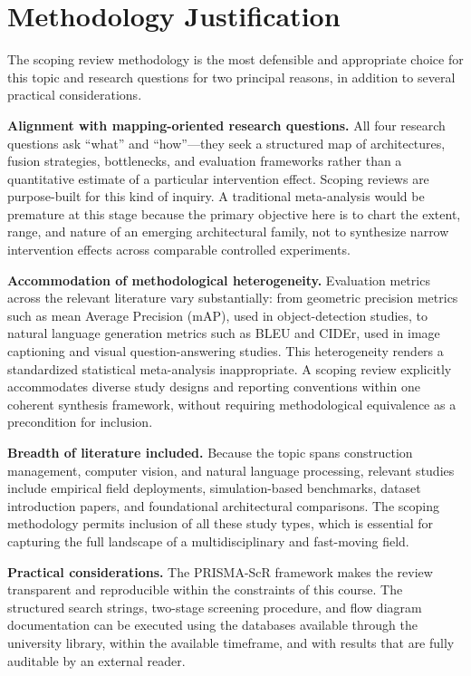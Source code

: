 \documentclass[11pt, letterpaper]{article}
\begin{document}
\section{Methodology Justification}

The scoping review methodology is the most defensible and appropriate choice
for this topic and research questions for two principal reasons, in addition
to several practical considerations.

\textbf{Alignment with mapping-oriented research questions.} All four research
questions ask ``what'' and ``how''---they seek a structured map of
architectures, fusion strategies, bottlenecks, and evaluation frameworks rather
than a quantitative estimate of a particular intervention effect. Scoping
reviews are purpose-built for this kind of inquiry. A traditional meta-analysis
would be premature at this stage because the primary objective here is to chart
the extent, range, and nature of an emerging architectural family, not to
synthesize narrow intervention effects across comparable controlled experiments.

\textbf{Accommodation of methodological heterogeneity.} Evaluation metrics
across the relevant literature vary substantially: from geometric precision
metrics such as mean Average Precision (mAP), used in object-detection studies,
to natural language generation metrics such as BLEU and CIDEr, used in image
captioning and visual question-answering studies. This heterogeneity renders a
standardized statistical meta-analysis inappropriate. A scoping review
explicitly accommodates diverse study designs and reporting conventions within
one coherent synthesis framework, without requiring methodological equivalence
as a precondition for inclusion.

\textbf{Breadth of literature included.} Because the topic spans construction
management, computer vision, and natural language processing, relevant studies
include empirical field deployments, simulation-based benchmarks, dataset
introduction papers, and foundational architectural comparisons. The scoping
methodology permits inclusion of all these study types, which is essential for
capturing the full landscape of a multidisciplinary and fast-moving field.

\textbf{Practical considerations.} The PRISMA-ScR framework makes the review
transparent and reproducible within the constraints of this course. The
structured search strings, two-stage screening procedure, and flow diagram
documentation can be executed using the databases available through the
university library, within the available timeframe, and with results that
are fully auditable by an external reader.
\end{document}
